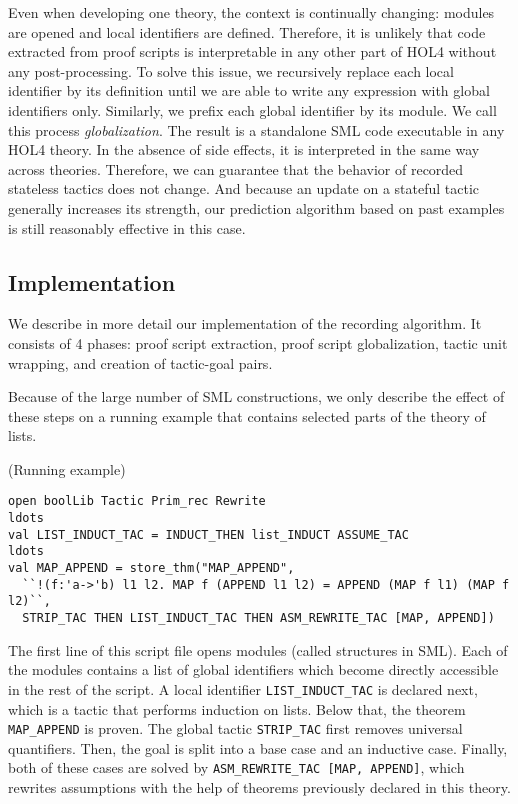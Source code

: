 \documentclass[runningheads,a4paper,draft]{svjour3}
\def\holfour{\textsf{HOL4}\xspace}
\def\sml{\textsf{SML}\xspace}
\begin{document}
Even when developing one theory, the context is continually changing:
modules are opened and local identifiers are defined. Therefore, it is unlikely
that code extracted from proof scripts is interpretable in any other part of
\holfour without any post-processing.
To solve this issue, we recursively replace each local identifier by its
definition until we are able to write any expression with global identifiers
only. Similarly, we prefix each global identifier by its module.
We call this process \emph{globalization}. The result is a standalone \sml code
executable in any \holfour theory.  In the absence of side effects, it is
interpreted in the same way across theories.
Therefore, we can guarantee that the behavior of recorded stateless tactics
does not change. And because an update on a stateful tactic
generally increases its strength, our prediction algorithm based on past
examples is still reasonably effective in this case.

\subsection{Implementation}
We describe in more detail our implementation of the recording algorithm. It
consists of 4 phases: proof script extraction, proof script globalization,
tactic unit wrapping, and creation of tactic-goal pairs.

Because of the large number of \sml constructions, we only describe the effect
of these steps on a running example that contains selected parts of the theory
of lists.


\begin{example}\label{ex:running}(Running example)
\small
\begin{lstlisting}[language=SMLSmall]
open boolLib Tactic Prim_rec Rewrite
ldots
val LIST_INDUCT_TAC = INDUCT_THEN list_INDUCT ASSUME_TAC
ldots
val MAP_APPEND = store_thm("MAP_APPEND",
  ``!(f:'a->'b) l1 l2. MAP f (APPEND l1 l2) = APPEND (MAP f l1) (MAP f l2)``,
  STRIP_TAC THEN LIST_INDUCT_TAC THEN ASM_REWRITE_TAC [MAP, APPEND])
\end{lstlisting}
\end{example}

The first line of this script file opens modules (called structures in \sml). Each of
the modules contains a list of global identifiers which become directly accessible in
the rest of the script.
A local identifier \texttt{LIST\_INDUCT\_TAC} is declared next, which is a
tactic that performs induction on lists. Below that, the theorem
\texttt{MAP\_APPEND} is proven.
The global tactic \texttt{STRIP\_TAC} first removes universal quantifiers. Then,
the goal is split into a base case and an inductive case. Finally, both
of these cases are solved by \texttt{ASM\_REWRITE\_TAC [MAP, APPEND]}, which
rewrites assumptions with the help of theorems previously declared in this
theory.
\end{document}
